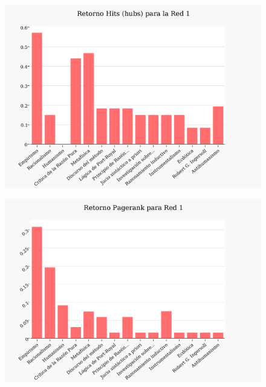\documentclass[a4paper]{article}
\begin{document}
\begin{figure}[h!]
  \begin{center}
	\includegraphics[scale=0.66]{imagenes/Exp1/hitsH1}
	\caption{}
	\label{hitsh1}
  \end{center}
\end{figure}

\newpage

\begin{figure}[h!]
  \begin{center}
	\includegraphics[scale=0.66]{imagenes/Exp1/PR1}
	\caption{}
	\label{PR1}
  \end{center}
\end{figure}
\end{document}
